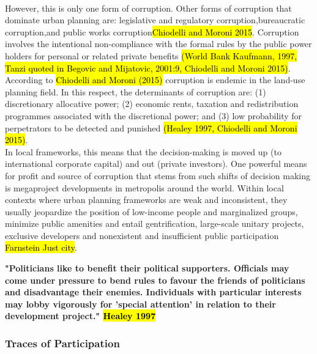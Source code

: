 \documentclass[11pt]{report}
\begin{document}
\\
However, this is only one form of corruption.
Other forms of corruption that dominate urban planning are: legislative and regulatory corruption,\footnotemark bureaucratic corruption,\footnotemark and public works corruption\footnotemark \hl{Chiodelli and Moroni 2015}. 
Corruption involves the intentional  non-compliance  with  the  formal  rules by the public power holders for personal or related private benefits \hl{(World Bank Kaufmann,  1997, Tanzi quoted in Begovic and Mijatovic,  2001:9, Chiodelli and Moroni 2015)}.
\\
According to \hl{Chiodelli and Moroni (2015)}
corruption is endemic in the land-use planning field.
In this respect, the determinants of corruption are:
(1) discretionary allocative power; (2) economic rents, taxation and redistribution programmes associated with the discretional power; and (3) low probability for perpetrators to be detected and punished \hl{(Healey 1997, Chiodelli and Moroni 2015)}.
\\
In local frameworks, this means that the decision-making is moved up (to international corporate capital) and out (private investors).
One powerful means for profit and source of corruption that stems from such shifts of decision making is megaproject developments in metropolis around the world.
Within local contexts where urban planning frameworks are weak and inconsistent, they usually jeopardize the position of low-income people and marginalized groups, minimize public amenities and entail gentrification, large-scale unitary projects, exclusive developers and nonexistent and insufficient public participation \hl{Farnstein Just city}.

\textbf{"Politicians like to benefit their political supporters. Officials may come under pressure to bend rules to favour the friends of politicians and disadvantage their enemies. Individuals with particular interests may lobby vigorously for 'special attention' in relation to their development project." \hl{Healey 1997}}

\subsubsection{Traces of Participation}
\end{document}
